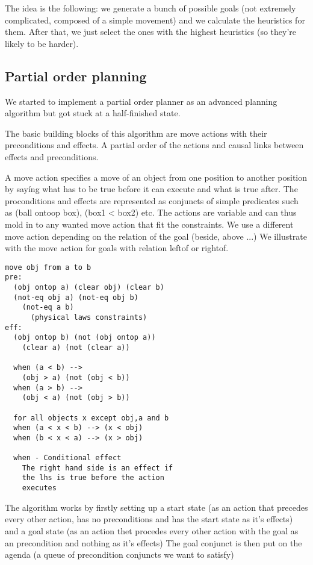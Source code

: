 \documentclass[11pt]{article}
\begin{document}
        The idea is the following: we generate a bunch of possible goals (not 
        extremely complicated, composed of a simple movement) and we calculate 
        the heuristics for them. After that, we just select the ones with the 
        highest heuristics (so they're likely to be harder).

	\subsection{Partial order planning}

        We started to implement a partial order planner as an advanced planning
        algorithm but got stuck at a half-finished state. 

        The basic building blocks of this algorithm are move actions with their
        preconditions and effects. A partial order of the actions and causal links
        between effects and preconditions.

        A move action specifies a move of an object from one position to another
        position by sayíng what has to be true before it can execute and what is true
        after.  The proconditions and effects are represented as conjuncts of simple
        predicates such as (ball ontoop box), (box1 < box2) etc.  The actions are
        variable and can thus mold in to any wanted move action that fit the
        constraints.  We use a different move action depending on the relation of the
        goal (beside, above ...) We illustrate with the move action for goals with
        relation leftof or rightof.

\begin{lstlisting}
move obj from a to b 
pre: 
  (obj ontop a) (clear obj) (clear b) 
  (not-eq obj a) (not-eq obj b)
    (not-eq a b)
      (physical laws constraints)
eff: 
  (obj ontop b) (not (obj ontop a))
    (clear a) (not (clear a))
  
  when (a < b) -->
    (obj > a) (not (obj < b))
  when (a > b) -->
    (obj < a) (not (obj > b))
  
  for all objects x except obj,a and b
  when (a < x < b) --> (x < obj)    
  when (b < x < a) --> (x > obj)

  when - Conditional effect
    The right hand side is an effect if
    the lhs is true before the action
    executes  
\end{lstlisting}

The algorithm works by firstly setting up a start state (as an action that
precedes every other action, has no preconditions and has the start state as
it's effects) and a goal state (as an action thet procedes every other action
with the goal as an precondition and nothing as it's effects) The goal conjunct
is then put on the agenda (a queue of precondition conjuncts we want to satisfy)
\end{document}
